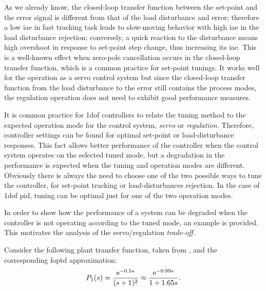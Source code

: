As we already know, the closed-loop transfer function between the set-point and the error signal is different from that of the load disturbance and error; therefore a low \gls{iae} in fast tracking task leads to slow-moving behavior with high \gls{iae} in the load disturbance rejection; conversely, a quick reaction to the disturbance means high overshoot in response to set-point step change, thus increasing its \gls{iae}. This is a well-known effect when zero-pole cancellation occurs in the closed-loop transfer function, which is a common practice for set-point tunings. It works well for the operation as a servo control system but since the closed-loop transfer function from the load disturbance to the error still contains the process modes, the regulation operation does not need to exhibit good performance measures.
 
It is common practice for \gls{1dof} controllers to relate the tuning method to the expected operation mode for the control system, \emph{servo} or \emph{regulation}. Therefore, controller settings can be found for optimal set-point or load-disturbance responses. This fact allows better performance of the controller when the control system operates on the selected tuned mode, but a degradation in the performance is expected when the tuning and operation modes are different. Obviously there is always the need to choose one of the two possible ways to tune the controller, for set-point tracking or load-disturbances rejection. In the case of \gls{1dof} \gls{pid}, tuning can be optimal just for one of the two operation modes.

In order to show how the performance of a system can be degraded when the controller is not operating according to the tuned mode, an example is provided. This motivates the analysis of the servo/regulation \emph{trade-off}.

Consider the following plant transfer function, taken from \citet{zhuang1993}, and the corresponding \gls{foptd} approximation:
%
\begin{equation}
P_1(s)=\frac{\mathrm{e}^{-0.5s}}{(s+1)^2} \approx \frac{\mathrm{e}^{-0.99s}}{1+1.65s}. \label{system_example} 
\end{equation}

